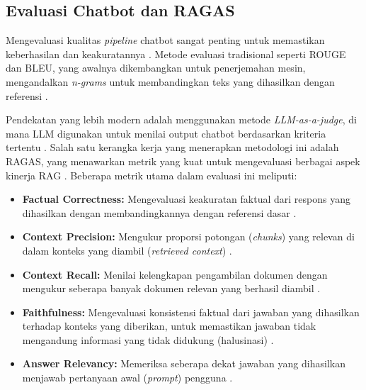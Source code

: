 \subsection{Evaluasi Chatbot dan RAGAS}
Mengevaluasi kualitas \textit{pipeline} chatbot sangat penting untuk memastikan keberhasilan dan keakuratannya \cite{Steininger2025}. Metode evaluasi tradisional seperti ROUGE dan BLEU, yang awalnya dikembangkan untuk penerjemahan mesin, mengandalkan \textit{n-grams} untuk membandingkan teks yang dihasilkan dengan referensi \cite{Steininger2025}.

Pendekatan yang lebih modern adalah menggunakan metode \textit{LLM-as-a-judge}, di mana LLM digunakan untuk menilai output chatbot berdasarkan kriteria tertentu \cite{Steininger2025}. Salah satu kerangka kerja yang menerapkan metodologi ini adalah RAGAS, yang menawarkan metrik yang kuat untuk mengevaluasi berbagai aspek kinerja RAG \cite{Steininger2025}. Beberapa metrik utama dalam evaluasi ini meliputi:

\begin{itemize}
    \item \textbf{Factual Correctness:} Mengevaluasi keakuratan faktual dari respons yang dihasilkan dengan membandingkannya dengan referensi dasar \cite{Steininger2025}.
    \item \textbf{Context Precision:} Mengukur proporsi potongan (\textit{chunks}) yang relevan di dalam konteks yang diambil (\textit{retrieved context}) \cite{Steininger2025}.
    \item \textbf{Context Recall:} Menilai kelengkapan pengambilan dokumen dengan mengukur seberapa banyak dokumen relevan yang berhasil diambil \cite{Steininger2025}.
    \item \textbf{Faithfulness:} Mengevaluasi konsistensi faktual dari jawaban yang dihasilkan terhadap konteks yang diberikan, untuk memastikan jawaban tidak mengandung informasi yang tidak didukung (halusinasi) \cite{Steininger2025}.
    \item \textbf{Answer Relevancy:} Memeriksa seberapa dekat jawaban yang dihasilkan menjawab pertanyaan awal (\textit{prompt}) pengguna \cite{Steininger2025}.
\end{itemize}

